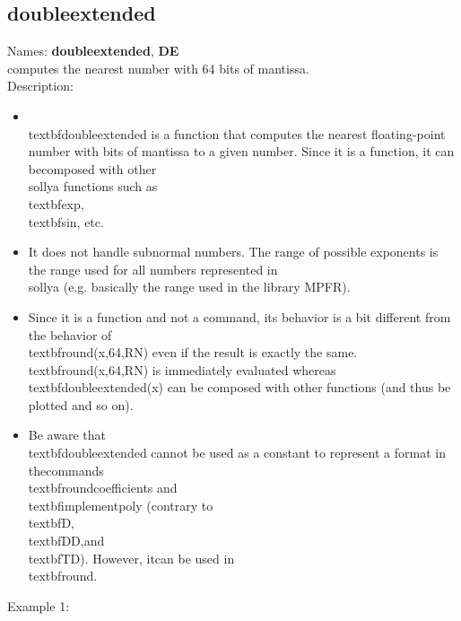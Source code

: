 \subsection{doubleextended}
\label{labdoubleextended}
\noindent Names: \textbf{doubleextended}, \textbf{DE}\\
computes the nearest number with 64 bits of mantissa.\\
\noindent Description: \begin{itemize}

\item \\textbf{doubleextended} is a function that computes the nearest floating-point number with bits of mantissa to a given number. Since it is a function, it can be\n   composed with other \\sollya functions such as \\textbf{exp}, \\textbf{sin}, etc.\n
\item It does not handle subnormal numbers. The range of possible exponents is the \n   range used for all numbers represented in \\sollya (e.g. basically the range \n   used in the library MPFR).\n
\item Since it is a function and not a command, its behavior is a bit different from \n   the behavior of \\textbf{round}(x,64,RN) even if the result is exactly the same.\n   \\textbf{round}(x,64,RN) is immediately evaluated whereas \\textbf{doubleextended}(x) can be composed \n   with other functions (and thus be plotted and so on).\n
\item Be aware that \\textbf{doubleextended} cannot be used as a constant to represent a format in the\n   commands \\textbf{roundcoefficients} and \\textbf{implementpoly} (contrary to \\textbf{D}, \\textbf{DD},and \\textbf{TD}). However, it\n   can be used in \\textbf{round}.\n\end{itemize}
\noindent Example 1: 
\begin{center}\begin{minipage}{15cm}\begin{Verbatim}[frame=single]
\end{Verbatim}
\end{minipage}\end{center}
